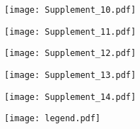 \documentclass[12pt,a4paper]{article}
\begin{document}
\begin{figure}
\begin{minipage}{6.2cm}
\begin{minipage}{6cm}
\begin{minipage}{6cm}
\end{minipage}
\end{minipage}
\end{minipage}
%
\hfill
\begin{minipage}{6.2cm}
\hspace{0.2cm}
\hfill
\begin{minipage}{6cm}
\begin{minipage}{6cm} 
\texttt{[image: Supplement\_10.pdf]}
\vspace{0.2cm}
\end{minipage}
\vfill
\begin{minipage}{6cm} 
\texttt{[image: Supplement\_11.pdf]}
\vspace{0.2cm}
\end{minipage}
\vfill
\begin{minipage}{6cm} 
\texttt{[image: Supplement\_12.pdf]}
\vspace{0.2cm}
\end{minipage}
\vfill
\begin{minipage}{6cm} 
\texttt{[image: Supplement\_13.pdf]}
\vspace{0.2cm}
\end{minipage}
\vfill
\begin{minipage}{6cm} 
\texttt{[image: Supplement\_14.pdf]}
\vspace{0.2cm}
\end{minipage}
\end{minipage}
\end{minipage}
\vfill
%
%
%
\begin{minipage}{21cm}
\begin{minipage}{10cm} 
\texttt{[image: legend.pdf]}
\end{minipage}
\hfill
\end{minipage}

\end{figure}
\end{document}
